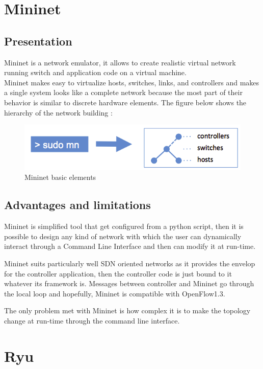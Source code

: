 \documentclass{article}
\begin{document}
\section{Mininet}

\subsection{Presentation}
Mininet is a network emulator, it allows to create realistic virtual
network running switch and application code on a virtual
machine.\\
\newline
Mininet makes easy to virtualize hosts, switches, links, and
controllers and makes a single system looks like a complete network
because the most part of their behavior is similar to discrete
hardware elements.  The figure below shows the hierarchy of the
network building :

\begin{figure}[h!]
  \centering
    \includegraphics[scale=0.5]{reportPictures/figure9.png}
  \caption{Mininet basic elements}
\end{figure}

\subsection{Advantages and limitations}

Mininet is simplified tool that get configured from a python script,
then it is possible to design any kind of network with which the user
can dynamically interact through a Command Line Interface and then can
modify it at run-time.

Mininet suits particularly well SDN oriented networks as it provides
the envelop for the controller application, then the controller code is just
bound to it whatever its framework is. Messages between controller and
Mininet go through the local loop and hopefully, Mininet is compatible
with OpenFlow1.3.

The only problem met with Mininet is how complex it is to make the
topology change at run-time through the command line interface.

\section{Ryu}
\end{document}

